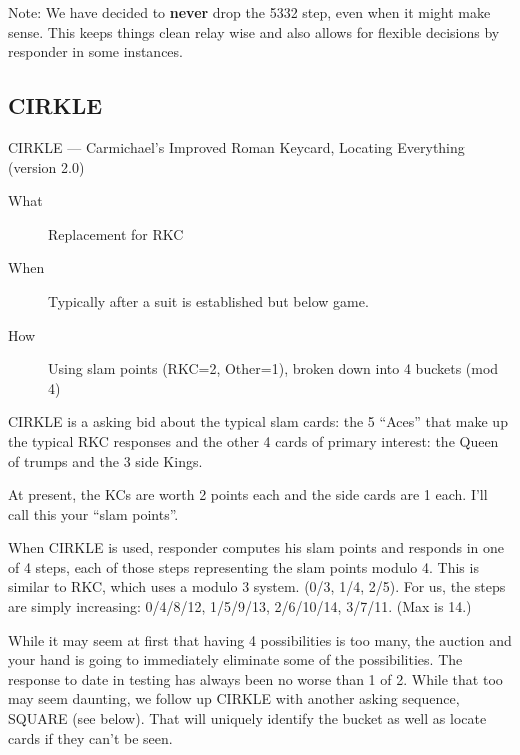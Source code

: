 \documentclass[tom-ari]{subfile}
\begin{document}
Note:  We have decided to \textbf{never} drop the 5332 step, even when it might make sense.  This keeps things clean relay wise and also allows for flexible decisions by responder in some instances.

\subsection{CIRKLE}

CIRKLE --- Carmichael's Improved Roman Keycard, Locating Everything (version 2.0)
 
\normalsize


\begin{description}
	\item[What] Replacement for RKC
	\item[When] Typically after a suit is established but below game.
	\item[How] Using slam points (RKC=2, Other=1), broken down into 4 buckets (mod 4) 
\end{description}

CIRKLE is a asking bid about the typical slam cards:  the 5 ``Aces'' that make up the typical RKC responses and the other 4 cards of primary interest:  the Queen of trumps and the 3 side Kings.

At present, the KCs are worth 2 points each and the side cards are 1 each.  I'll call this your ``slam points''.

When CIRKLE is used, responder computes his slam points and responds in one of 4 steps, each of those steps representing the slam points modulo 4. This is similar to RKC, which uses a modulo 3 system.  (0/3, 1/4, 2/5).  For us, the steps are simply increasing:  0/4/8/12, 1/5/9/13, 2/6/10/14, 3/7/11. (Max is 14.)

While it may seem at first that having 4 possibilities is too many, the auction and your hand is going to immediately eliminate some of the possibilities.  The response to date in testing has always been no worse than 1 of 2.  While that too may seem daunting, we follow up CIRKLE with another asking sequence, SQUARE (see below).  That will uniquely identify the bucket as well as locate cards if they can't be seen.
\end{document}
